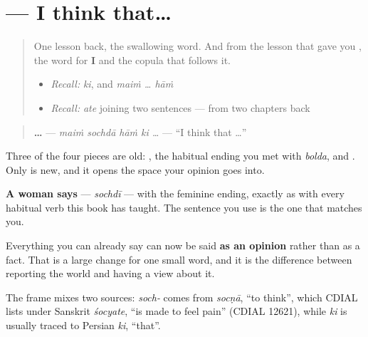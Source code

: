 \section[\texorpdfstring{\pa{ਮੈਂ} \pa{ਸੋਚਦਾ} \pa{ਹਾਂ} \pa{ਕਿ} (maiṁ sochdā hāṁ ki)}{ਮੈਂ ਸੋਚਦਾ ਹਾਂ ਕਿ (maiṁ sochdā hāṁ ki)}]{    — I think that…}

\label{lesson:PA-C40-sochda-ki}



\begin{quote}
One lesson back, the swallowing word. And from the lesson that gave you \textbf{}, the word for \textbf{I} and the copula that follows it.

\begin{itemize}
\raggedright
  \item \emph{Recall:} \emph{ki}, and \emph{maiṁ … hāṁ}
  \item \emph{Recall:} \emph{ate} joining two sentences — from two chapters back
\end{itemize}
\end{quote}

\begin{cousinweb}
\begin{quote}
\textbf{    …} — \emph{maiṁ sochdā hāṁ ki …} — \textquotedblleft{}I think that …\textquotedblright{}
\end{quote}

Three of the four pieces are old: \textbf{}, the habitual ending you met with \emph{bolda}, and \textbf{}. Only \textbf{} is new, and it opens the space your opinion goes into.

\textbf{A woman says } — \emph{sochdī} — with the feminine ending, exactly as with every habitual verb this book has taught. The sentence you use is the one that matches you.

Everything you can already say can now be said \textbf{as an opinion} rather than as a fact. That is a large change for one small word, and it is the difference between reporting the world and having a view about it.

The frame mixes two sources: \emph{soch-} comes from \emph{socṇā}, \textquotedblleft{}to think\textquotedblright{}, which CDIAL lists under Sanskrit \emph{śocyate}, \textquotedblleft{}is made to feel pain\textquotedblright{} (CDIAL 12621), while \emph{ki} is usually traced to Persian \emph{ki}, \textquotedblleft{}that\textquotedblright{}.
\end{cousinweb}

